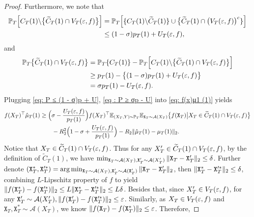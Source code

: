\begin{proof}
Furthermore, we note that
\begin{align}
\label{eq: P ≤ (1 - σ)p + U}
\mathbb{P}_T\Big[C_T(1) \backslash \big\{\widetilde{C}_T(1) \cap V_T(\varepsilon, f)\big\}\Big] &= \mathbb{P}_T\Big[\{C_T(1) \backslash \widetilde{C}_T(1)\} \cup \big\{\widetilde{C}_T(1) \cap \big(V_T(\varepsilon, f)\big)^c\}\Big] \nonumber \\ 
&\leq (1 - \sigma)p_T(1) + U_T(\varepsilon, f),
\end{align}
and
\begin{align}
\label{eq : P ≥ σp - U}
\mathbb{P}_T\big\{\widetilde{C}_T(1) \cap V_T(\varepsilon, f)\big\} &= \mathbb{P}_T\{C_T(1)\} - \mathbb{P}_T\Big[C_T(1) \backslash \big\{\widetilde{C}_T(1) \cap V_T(\varepsilon, f)\big\}\Big] \nonumber \\
&\geq p_T(1) - \big\{(1 - \sigma)p_T(1) + U_T(\varepsilon, f)\big\} \nonumber \\ 
&= \sigma p_T(1) - U_T(\varepsilon, f).
\end{align}
Plugging \eqref{eq: P ≤ (1 - σ)p + U}, \eqref{eq : P ≥ σp - U} into \eqref{eq: f(x)μ1 (1)} yields
\begin{align}
\label{eq: f(x)μ1 (2)}
f(X_T)^{\top}\hat{\mu}_T(1) &\geq \Big(\sigma - \frac{U_T(\varepsilon, f)}{p_T(1)}\Big)f(X_T)^\top\mathbb{E}_{(X_T ,Y) \sim \mathbb{P}_T}\mathbb{E}_{\mathtt{X}_T \sim \mathcal{A}(X_T)}\big\{f(\mathtt{X}_T) \big\vert X_T \in \widetilde{C}_T(1) \cap V_T(\varepsilon, f)\big\}  \nonumber\\ 
&\qquad - R_2^2\Big(1 - \sigma + \frac{U_T(\varepsilon, f)}{p_T(1)}\Big) - R_2\Vert{\hat{\mu}_T(1) - \mu_T(1)}\Vert_2.
\end{align}
Notice that $X_T \in \widetilde{C}_T(1) \cap V_T(\varepsilon, f)$. Thus for any $X_T^\prime \in \widetilde{C}_T(1)\cap V_T(\varepsilon, f)$, by the definition of $\widetilde{C}_T(1)$, we have $\min_{\mathtt{X}_T \sim \mathcal{A}(X_T), \mathtt{X}_T^\prime \sim \mathcal{A}(X_T^\prime)}\Vert{\mathtt{X}_T - \mathtt{X}_T^\prime}\Vert_2 \leq \delta$. Further denote $(\mathtt{X}_T^*, \mathtt{X}_T^{\prime*}) = \arg\min_{\mathtt{X}_T \sim \mathcal{A}(X_T), \mathtt{X}_T^\prime \sim \mathcal{A}(\mathtt{X}_T^\prime)}\Vert{\mathtt{X}_T - \mathtt{X}_T^\prime}\Vert_2$, then $\Vert{\mathtt{X}_T^* - \mathtt{X}_T^{\prime*}}\Vert_2 \leq \delta$, combining $L$-Lipschitz property of $f$ to yield $\Vert{f(\mathtt{X}_T^*) - f(\mathtt{X}_T^{\prime*})}\Vert_2 \leq L \Vert{\mathtt{X}_T^* - \mathtt{X}_T^{\prime*}}\Vert_2 \leq L\delta$. Besides that, since $X_T^\prime \in V_T(\varepsilon, f)$, for any $\mathtt{X}_T^\prime \sim \mathcal{A}(X_T^\prime), \Vert{f(\mathtt{X}_T^\prime) - f(\mathtt{X}_T^{\prime*})}\Vert_2 \leq \varepsilon$. Similarly, as $X_T \in V_T(\varepsilon, f)$ and $\mathtt{X}_T, \mathtt{X}_T^* \sim \mathcal{A}(X_T)$, we know $\Vert{f(\mathtt{X}_T) - f(\mathtt{X}_T^*)}\Vert_2 \leq \varepsilon$. Therefore,

\end{proof}
